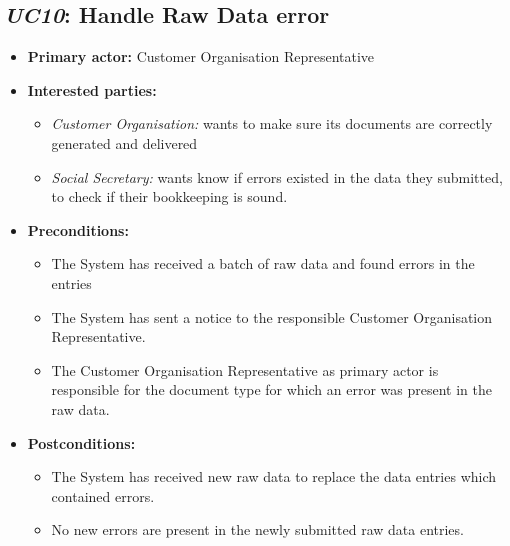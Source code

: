 \documentclass[a4paper,10pt]{article}
\begin{document}
\subsection{\emph{UC10}: Handle Raw Data error}
\begin{itemize}
    \item \textbf{Primary actor:} Customer Organisation Representative
    \item \textbf{Interested parties:} 
        \begin{itemize}
            \item \textit{Customer Organisation:} wants to make sure its documents are correctly generated and delivered
            \item \textit{Social Secretary:} wants know if errors existed in the data they submitted, to check if their bookkeeping is sound.
        \end{itemize}

    \item \textbf{Preconditions:}
        \begin{itemize}
            \item The System has received a batch of raw data and found errors in the entries
            \item The System has sent a notice to the responsible Customer Organisation Representative.
            \item The Customer Organisation Representative as primary actor is responsible for the document type for which an error was present in the raw data.
        \end{itemize}

    \item \textbf{Postconditions:}
        \begin{itemize}
            \item The System has received new raw data to replace the data entries which contained errors.
            \item No new errors are present in the newly submitted raw data entries.
        \end{itemize}
        

\end{itemize}
\end{document}
